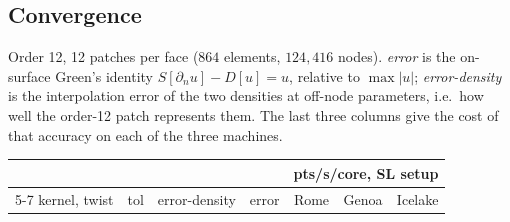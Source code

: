 \documentclass[11pt]{article}
\begin{document}
\subsection{Convergence}

Order 12, 12 patches per face ($864$ elements, $124{,}416$ nodes). \emph{error} is the on-surface
Green's identity $S[\partial_n u]-D[u]=u$, relative to $\max|u|$; \emph{error-density} is the
interpolation error of the two densities at off-node parameters, i.e.\ how well the order-12
patch represents them. The last three columns give the cost of that accuracy on each of the three machines.

\begin{table}[H]\centering\small
\begin{tabular}{@{}llllrrr@{}}
\toprule
 & & & & \multicolumn{3}{c}{pts/s/core, SL setup} \\
\cmidrule(l){5-7}
kernel, twist & tol & error-density & error & Rome & Genoa & Icelake \\
\midrule


\end{tabular}
\end{table}
\end{document}
